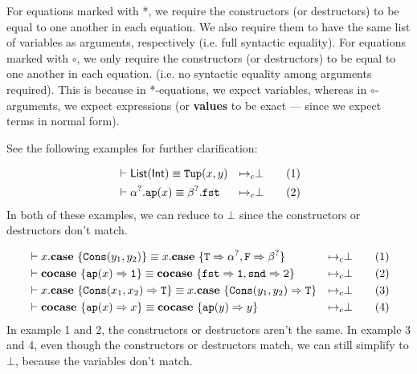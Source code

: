 \documentclass[twoside,12pt,a4paper]{article}
\begin{document}
For equations marked with *, we require the constructors (or destructors) to be equal to one another in each equation. 
We also require them to have the same list of variables as arguments, respectively (i.e. full syntactic equality).
For equations marked with $\circ$, we only require the constructors (or destructors) to be equal to one another in each equation. 
(i.e. no syntactic equality among arguments required).
This is because in *-equations, we expect variables, whereas in $\circ$-arguments, we expect expressions (or \textbf{values} to be exact --- since we expect terms in normal form).

See the following examples for further clarification:
\begin{example}
    \begin{align}
        &\vdash \mathsf{List(Int)}\equiv \mathtt{Tup(}x, y\mathtt{)}
        &\mapsto_c& \bot \tag{1}\\
        &\vdash \alpha^?.\texttt{ap}(x) \equiv \beta^?.\mathtt{fst}
        &\mapsto_c& \bot \tag{2}
    \end{align}
    In both of these examples, we can reduce to $\bot$ since the constructors or destructors don't match.
\end{example}

\begin{example}
    \begin{align*}
        &\vdash x.\textbf{case}\ \{\mathtt{Cons(}y_1, y_2\mathtt{)}\} 
        \equiv x.\textbf{case}\ \{\mathtt{T} \Rightarrow\alpha^?, \mathtt{F}\Rightarrow \beta^?\}
        &\mapsto_c& \bot \tag{1}\\
        &\vdash \textbf{cocase}\ \{\texttt{ap}(x)\Rightarrow \mathtt{1}\}
        \equiv \textbf{cocase}\ \{\mathtt{fst\Rightarrow 1, snd\Rightarrow 2}\}
        &\mapsto_c& \bot \tag{2}\\
        &\vdash x.\textbf{case}\ \{\mathtt{Cons(}x_1, x_2\mathtt{)}\Rightarrow \mathtt{T}\} 
        \equiv x.\textbf{case}\ \{\mathtt{Cons(}y_1, y_2\mathtt{)}\Rightarrow\mathtt{T}\}
        &\mapsto_c& \bot \tag{3}\\
        &\vdash \textbf{cocase}\ \{\texttt{ap}(x)\Rightarrow x\}
        \equiv \textbf{cocase}\ \{\texttt{ap}(y)\Rightarrow y\}
        &\mapsto_c& \bot \tag{4}
    \end{align*}
    In example 1 and 2, the constructors or destructors aren't the same.
    In example 3 and 4, even though the constructors or destructors match, we can still simplify to $\bot$, because the variables don't match.
\end{example}
\end{document}
